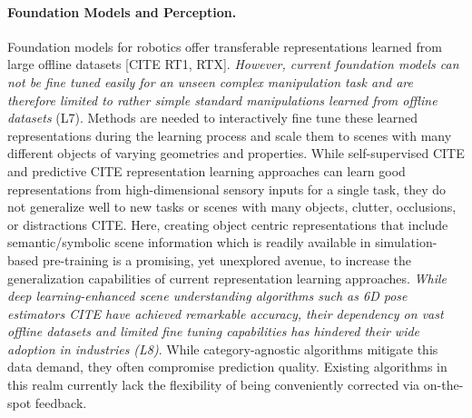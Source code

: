 \begin{refsection}
\paragraph{Foundation Models and Perception.} Foundation models for robotics offer transferable representations learned from large offline datasets [CITE RT1, RTX]. \textit{However, current foundation models can not be fine tuned easily for an unseen complex manipulation task and are therefore limited to rather simple standard manipulations learned from offline datasets} (L7). Methods are needed to interactively fine tune these learned representations during the learning process and scale them to scenes with many different objects of varying geometries and properties. While self-supervised CITE and predictive CITE representation learning approaches can learn good representations from high-dimensional sensory inputs for a single task, they do not generalize well to new tasks or scenes with many objects, clutter, occlusions, or distractions CITE. Here, creating object centric representations that include semantic/symbolic scene information which is readily available in simulation-based pre-training is a promising, yet unexplored avenue, to increase the generalization capabilities of current representation learning approaches. 
\textit{While deep learning-enhanced scene understanding algorithms such as 6D pose estimators CITE have achieved remarkable accuracy, their dependency on vast offline datasets and limited fine tuning capabilities has hindered their wide adoption in industries (L8)}. While category-agnostic algorithms mitigate this data demand, they often compromise prediction quality. Existing algorithms in this realm currently lack the flexibility of being conveniently corrected via on-the-spot feedback.




\end{refsection}
